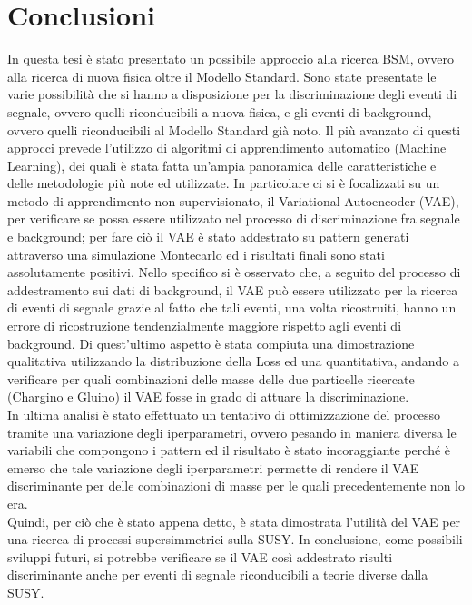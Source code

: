 
\section{Conclusioni}
\label{sec:conclusioni}

In questa tesi è stato presentato un possibile approccio alla ricerca BSM, ovvero alla ricerca di nuova fisica oltre il Modello Standard. Sono state presentate le varie possibilità che si hanno a disposizione per la discriminazione degli eventi di segnale, ovvero quelli riconducibili a nuova fisica, e gli eventi di background, ovvero quelli riconducibili al Modello Standard già noto. Il più avanzato di questi approcci prevede l'utilizzo di algoritmi di apprendimento automatico (Machine Learning), dei quali è stata fatta un'ampia panoramica delle caratteristiche e delle metodologie più note ed utilizzate. In particolare ci si è focalizzati su un metodo di apprendimento non supervisionato, il Variational Autoencoder (VAE), per verificare se possa essere utilizzato nel processo di discriminazione fra segnale e background; per fare ciò il VAE è stato addestrato su pattern generati attraverso una simulazione Montecarlo ed i risultati finali sono stati assolutamente positivi. Nello specifico si è osservato che, a seguito del processo di addestramento sui dati di background, il VAE può essere utilizzato per la ricerca di eventi di segnale grazie al fatto che tali eventi, una volta ricostruiti, hanno un errore di ricostruzione tendenzialmente maggiore rispetto agli eventi di background. Di quest'ultimo aspetto è stata compiuta una dimostrazione qualitativa utilizzando la distribuzione della Loss ed una quantitativa, andando a verificare per quali combinazioni delle masse delle due particelle ricercate (Chargino e Gluino) il VAE fosse in grado di attuare la discriminazione.\\
In ultima analisi è stato effettuato un tentativo di ottimizzazione del processo tramite una variazione degli iperparametri, ovvero pesando in maniera diversa le variabili che compongono i pattern ed il risultato è stato incoraggiante perché è emerso che tale variazione degli iperparametri permette di rendere il VAE discriminante per delle combinazioni di masse per le quali precedentemente non lo era.\\
Quindi, per ciò che è stato appena detto, è stata dimostrata l'utilità del VAE per una ricerca di processi supersimmetrici sulla SUSY. In conclusione, come possibili sviluppi futuri, si potrebbe verificare se il VAE così addestrato risulti discriminante anche per eventi di segnale riconducibili a teorie diverse dalla SUSY.